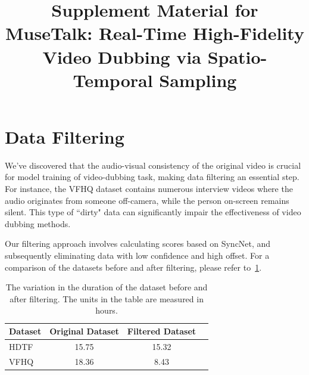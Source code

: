 \documentclass[10pt,twocolumn,letterpaper]{article}
\title{Supplement Material for MuseTalk: Real-Time High-Fidelity Video Dubbing via Spatio-Temporal Sampling}
\begin{document}
\maketitle


\section{Data Filtering}

We've discovered that the audio-visual consistency of the original video is crucial for model training of video-dubbing task, making data filtering an essential step. 
For instance, the VFHQ dataset contains numerous interview videos where the audio originates from someone off-camera, while the person on-screen remains silent. This type of ``dirty" data can significantly impair the effectiveness of video dubbing methods.

Our filtering approach involves calculating scores based on SyncNet, and subsequently eliminating data with low confidence and high offset. For a comparison of the datasets before and after filtering, please refer to~\cref{tab:dataset_statistics}.



\begin{table}[t]
\begin{tabular}{lccc}
\toprule
\textbf{Dataset}   & \textbf{Original Dataset}& \textbf{Filtered Dataset}\\
\midrule
HDTF~\cite{zhang2021flow}   & 15.75 & 15.32 \\
VFHQ~\cite{xie2022vfhq}   & 18.36 &  8.43 \\
\bottomrule
\end{tabular}
\caption{The variation in the duration of the dataset before and after filtering. The units in the table are measured in hours.}
\label{tab:dataset_statistics}
\end{table}
\end{document}
